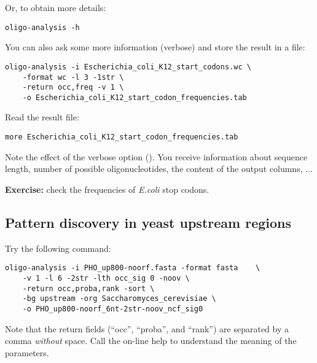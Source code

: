 Or, to obtain more details:
{\color{Blue} \begin{footnotesize} 
\begin{verbatim}
oligo-analysis -h
\end{verbatim} \end{footnotesize}
}



You can also ask some more information (verbose) and store the result
in a file:

{\color{Blue} \begin{footnotesize} 
\begin{verbatim}
oligo-analysis -i Escherichia_coli_K12_start_codons.wc \
    -format wc -l 3 -1str \
    -return occ,freq -v 1 \
    -o Escherichia_coli_K12_start_codon_frequencies.tab
\end{verbatim} \end{footnotesize}
}


Read the result file:

{\color{Blue} \begin{footnotesize} 
\begin{verbatim}
more Escherichia_coli_K12_start_codon_frequencies.tab
\end{verbatim} \end{footnotesize}
}


Note the effect of the verbose option (). You receive
information about sequence length, number of possible
oligonucleotides, the content of the output columns, ...

\textbf{Exercise:} check the frequencies of \textit{E.coli} stop codons.

\subsection{Pattern discovery in yeast upstream regions}

Try the following command:

{\color{Blue} \begin{footnotesize} 
\begin{verbatim} 
oligo-analysis -i PHO_up800-noorf.fasta -format fasta    \
    -v 1 -l 6 -2str -lth occ_sig 0 -noov \
    -return occ,proba,rank -sort \
    -bg upstream -org Saccharomyces_cerevisiae \
    -o PHO_up800-noorf_6nt-2str-noov_ncf_sig0 
\end{verbatim} \end{footnotesize}
}


Note that the return fields (``occ'', ``proba'', and ``rank'') are
separated by a comma \textit{without} space. Call the on-line help to
understand the meaning of the parameters.

